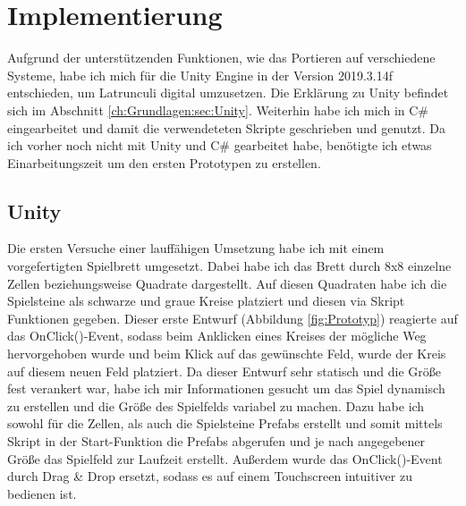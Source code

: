 
\chapter{Implementierung}
\label{ch:Implementierung}

Aufgrund der unterstützenden Funktionen, wie das Portieren auf verschiedene Systeme, habe ich mich für die Unity Engine in der Version 2019.3.14f entschieden, um Latrunculi digital umzusetzen. Die Erklärung zu Unity befindet sich im Abschnitt \ref{ch:Grundlagen:sec:Unity}. Weiterhin habe ich mich in C\# eingearbeitet und damit die verwendeteten Skripte geschrieben und genutzt. Da ich vorher noch nicht mit Unity und C\# gearbeitet habe, benötigte ich etwas Einarbeitungszeit um den ersten Prototypen zu erstellen.


\section{Unity}
\label{ch:Implementierung:sec:Unity}

Die ersten Versuche einer lauffähigen Umsetzung habe ich mit einem vorgefertigten Spielbrett umgesetzt. Dabei habe ich das Brett durch 8x8 einzelne Zellen beziehungsweise Quadrate dargestellt. Auf diesen Quadraten habe ich die Spielsteine als schwarze und graue Kreise platziert und diesen via Skript Funktionen gegeben. Dieser erste Entwurf (Abbildung \ref{fig:Prototyp}) reagierte auf das OnClick()-Event, sodass beim Anklicken eines Kreises der mögliche Weg hervorgehoben wurde und beim Klick auf das gewünschte Feld, wurde der Kreis auf diesem neuen Feld platziert.
Da dieser Entwurf sehr statisch und die Größe fest verankert war, habe ich mir Informationen gesucht um das Spiel dynamisch zu erstellen und die Größe des Spielfelds variabel zu machen. Dazu habe ich sowohl für die Zellen, als auch die Spielsteine Prefabs erstellt und somit mittels Skript in der Start-Funktion die Prefabs abgerufen und je nach angegebener Größe das Spielfeld zur Laufzeit erstellt.
Außerdem wurde das OnClick()-Event durch Drag \& Drop ersetzt, sodass es auf einem Touchscreen intuitiver zu bedienen ist.
